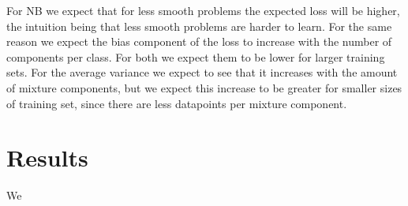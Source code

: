 \documentclass[a4paper]{article}
\begin{document}
For \ac{NB} we expect that for less smooth problems the expected loss will be higher, the intuition being that less smooth problems are harder to learn. For the same reason we expect the bias component of the loss to increase with the number of components per class. For both we expect them to be lower for larger training sets. For the average variance we expect to see that it increases with the amount of mixture components, but we expect this increase to be greater for smaller sizes of training set, since there are less datapoints per mixture component.

\section{Results}
\label{sec:results}

We 







\end{document}
